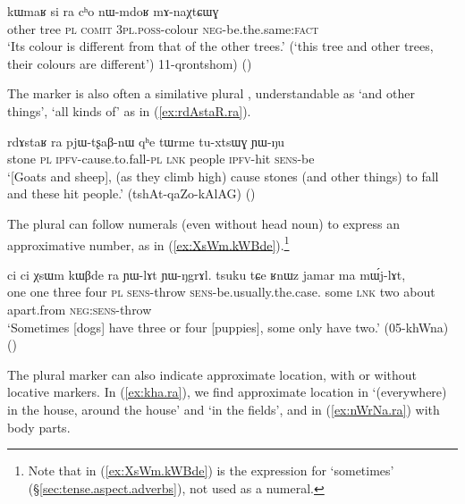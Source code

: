\begin{exe}
\ex \label{ex:si.ra.cho}
\gll kɯmaʁ si ra cʰo nɯ-mdoʁ mɤ-naχtɕɯɣ \\
other tree \textsc{pl} \textsc{comit} \textsc{3pl}.\textsc{poss}-colour \textsc{neg}-be.the.same:\textsc{fact} \\
\glt `Its colour is different from that of the other trees.' (`this tree and other trees, their colours are different') 11-qrontshom)
()
\end{exe} 

The marker  is also often a similative plural \citep{mauri18categorization}, understandable as `and other things', `all kinds of' as in (\ref{ex:rdAstaR.ra}).

\begin{exe}
\ex \label{ex:rdAstaR.ra}
\gll rdɤstaʁ ra pjɯ-tʂaβ-nɯ qʰe tɯrme tu-xtsɯɣ ɲɯ-ŋu \\
stone \textsc{pl} \textsc{ipfv}-cause.to.fall-\textsc{pl} \textsc{lnk} people \textsc{ipfv}-hit \textsc{sens}-be \\
\glt `[Goats and sheep], (as they climb high) cause stones (and other things) to fall and these hit people.' (tshAt-qaZo-kAlAG) ()
\end{exe} 

The plural can follow numerals (even without head noun) to express an approximative number, as in (\ref{ex:XsWm.kWBde}).\footnote{Note that in (\ref{ex:XsWm.kWBde})  is the expression for `sometimes' (§\ref{sec:tense.aspect.adverbs}), not used as a numeral.} 

\begin{exe}
\ex \label{ex:XsWm.kWBde}
\gll ci ci χsɯm kɯβde ra ɲɯ-lɤt ɲɯ-ŋgrɤl. tsuku tɕe ʁnɯz jamar ma mɯ́j-lɤt,\\
one one three four \textsc{pl} \textsc{sens}-throw \textsc{sens}-be.usually.the.case. some \textsc{lnk} two about apart.from \textsc{neg}:\textsc{sens}-throw \\
\glt  `Sometimes [dogs] have three or four [puppies], some only have two.' (05-khWna)
()
\end{exe} 

The plural marker  can also indicate approximate location, with or without locative markers. In (\ref{ex:kha.ra}), we find approximate location  in  `(everywhere) in the house, around the house' and  `in the fields', and in (\ref{ex:nWrNa.ra}) with body parts.

